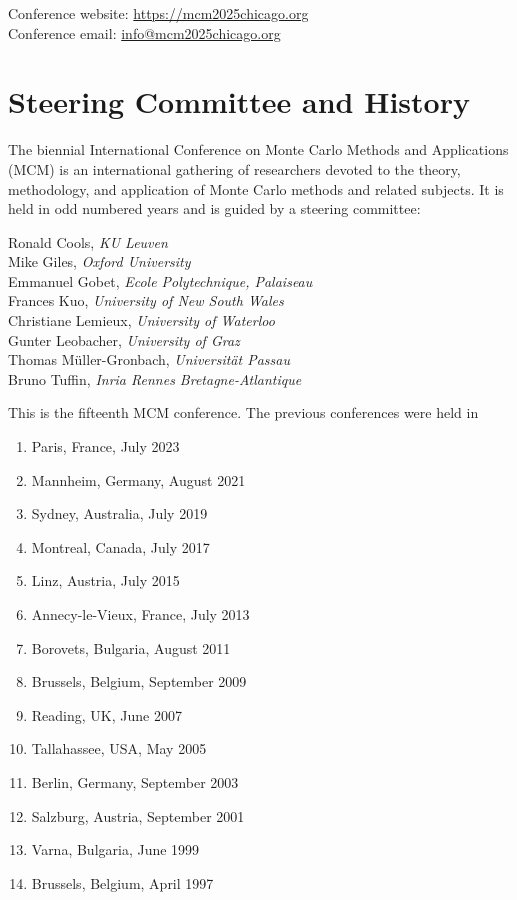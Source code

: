 \vfill
Conference website: \url{https://mcm2025chicago.org} \\
Conference email: \url{info@mcm2025chicago.org}



\section{Steering Committee and History}


The biennial International Conference on Monte Carlo Methods and Applications (MCM) is an international gathering of researchers devoted to the theory, methodology, and application of Monte Carlo methods and related subjects. It is held in odd numbered years and is guided by a steering committee: 

Ronald Cools, \emph{KU Leuven} \\
Mike Giles, \emph{Oxford University} \\
Emmanuel Gobet, \emph{Ecole Polytechnique, Palaiseau} \\
Frances Kuo, \emph{University of New South Wales} \\
Christiane Lemieux, \emph{University of Waterloo} \\
Gunter Leobacher, \emph{University of Graz} \\
Thomas Müller-Gronbach, \emph{Universität Passau} \\
Bruno Tuffin, \emph{Inria Rennes Bretagne-Atlantique}

This is the fifteenth MCM conference.  The previous  conferences were held in
\begin{enumerate}
\item Paris, France, July 2023
\item Mannheim, Germany, August 2021
\item Sydney, Australia, July 2019
\item Montreal, Canada, July 2017
\item Linz, Austria, July 2015
\item Annecy-le-Vieux, France, July 2013
\item Borovets, Bulgaria, August 2011
\item Brussels, Belgium, September 2009
\item Reading, UK, June 2007
\item Tallahassee, USA, May 2005
\item Berlin, Germany, September 2003
\item Salzburg, Austria, September 2001
\item Varna, Bulgaria, June 1999
\item Brussels, Belgium, April 1997 
\end{enumerate}

